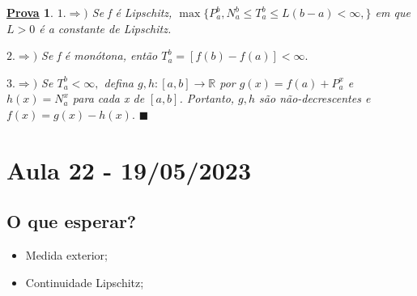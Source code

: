 \documentclass{article}
\newtheorem*{proof*}{\underline{Prova}}
\renewcommand\qedsymbol{$\blacksquare$}
\begin{document}
\begin{proof*}
  \(1. \Rightarrow )\) Se f é Lipschitz, \(\max\{P_{a}^{b}, N_{a}^{b}\leq T_{a}^{b}\leq L(b-a) < \infty,\}\)
em que \(L > 0\) é a constante de Lipschitz.

  \(2. \Rightarrow )\) Se f é monótona, então \(T_{a}^{b} = [f(b)-f(a)] < \infty.\)

  \(3. \Rightarrow )\) Se \(T_{a}^{b} < \infty,\) defina \(g, h:[a, b]\rightarrow \mathbb{R}\) por 
 \(g(x) = f(a) + P_{a}^{x}\) e \(h(x) = N_{a}^{x}\) para cada x de \([a, b]\). Portanto,
 \(g, h\) são não-decrescentes e \(f(x) = g(x) - h(x).\) \qedsymbol
\end{proof*}
\newpage
\section{Aula 22 - 19/05/2023}
\subsection{O que esperar?}
\begin{itemize}
  \item Medida exterior;
  \item Continuidade Lipschitz;
\end{itemize}
\end{document}
